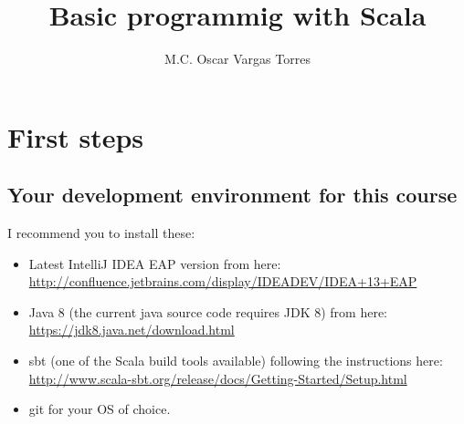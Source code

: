 \documentclass[fontsize=12pt, parskipp=full, paper=legal]{scrbook}
\title{Basic programmig with Scala}
\author{M.C. Oscar Vargas Torres}
\begin{document}
\maketitle

\chapter{First steps}

\section{Your development environment for this course}
I recommend you to install these:
\begin{itemize}
\item Latest IntelliJ IDEA EAP version from here:\\
 \url{http://confluence.jetbrains.com/display/IDEADEV/IDEA+13+EAP}
\item Java 8 (the current java source code requires JDK 8) from here:\\
 \url{https://jdk8.java.net/download.html}
\item sbt (one of the Scala build tools available) following the
  instructions here:\\
 \url{http://www.scala-sbt.org/release/docs/Getting-Started/Setup.html}
\item git for your OS of choice.
\end{itemize}
\end{document}
